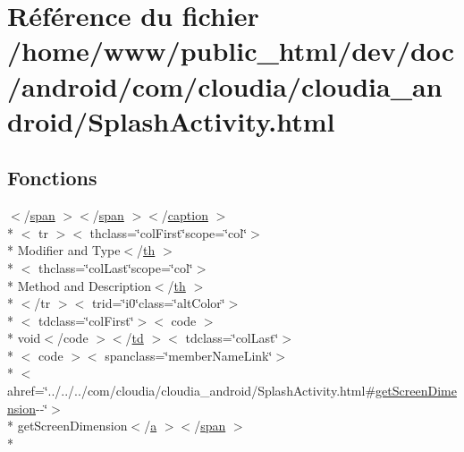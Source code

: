 \hypertarget{_splash_activity_8html}{\section{Référence du fichier /home/www/public\-\_\-html/dev/doc/android/com/cloudia/cloudia\-\_\-android/\-Splash\-Activity.html}
\label{_splash_activity_8html}
}
\subsection*{Fonctions}
\begin{DoxyCompactItemize}
\item 
$<$/\hyperlink{stylesheet_8css_a8343996ebcf16220b04e54659aac31cc}{span} $>$$<$/\hyperlink{stylesheet_8css_a8343996ebcf16220b04e54659aac31cc}{span} $>$$<$/\hyperlink{stylesheet_8css_af80f57db1ff8f5d004463f9fcbf50c6f}{caption} $>$\\*
$<$ tr $>$$<$ thclass=\char`\"{}col\-First\char`\"{}scope=\char`\"{}col\char`\"{}$>$\\*
 Modifier and Type$<$/\hyperlink{stylesheet_8css_a0910f46cbaedf1a50e2b4337fde699db}{th} $>$\\*
$<$ thclass=\char`\"{}col\-Last\char`\"{}scope=\char`\"{}col\char`\"{}$>$\\*
 Method and Description$<$/\hyperlink{stylesheet_8css_a0910f46cbaedf1a50e2b4337fde699db}{th} $>$\\*
$<$/tr $>$$<$ trid=\char`\"{}i0\char`\"{}class=\char`\"{}alt\-Color\char`\"{}$>$\\*
$<$ tdclass=\char`\"{}col\-First\char`\"{}$>$$<$ code $>$\\*
 void$<$/code $>$$<$/\hyperlink{stylesheet_8css_a2635d454965afd759ce151c6f6d1a04a}{td} $>$$<$ tdclass=\char`\"{}col\-Last\char`\"{}$>$\\*
$<$ code $>$$<$ spanclass=\char`\"{}member\-Name\-Link\char`\"{}$>$\\*
$<$ ahref=\char`\"{}../../../com/cloudia/cloudia\-\_\-android/Splash\-Activity.\-html\#\hyperlink{_splash_activity_8html_a0e6f4bbb7be9e4feeb81dde54932ae5c}{get\-Screen\-Dimension}-\/-\/\char`\"{}$>$\\*
 get\-Screen\-Dimension$<$/\hyperlink{style_8css_a5e8981582017bb8b84c21f148345d1f7}{a} $>$$<$/\hyperlink{stylesheet_8css_a8343996ebcf16220b04e54659aac31cc}{span} $>$\\*
$$
\end{DoxyCompactItemize}
